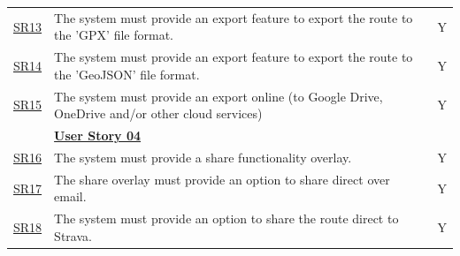 \begin{table}[!htb]
\begin{tabularx}{\textwidth}{ p{1cm} p{11cm} p{1cm} }
        \hyperref[SR:13]{SR13} & The system must provide an export feature to export the route to the 'GPX' file format. & Y\\
        \hyperref[SR:14]{SR14} & The system must provide an export feature to export the route to the 'GeoJSON' file format. & Y\\ 
        \hyperref[SR:15]{SR15} & The system must provide an export online (to Google Drive, OneDrive and/or other cloud services) & Y\\
        \hline
        & \textbf{\hyperref[tab:user-story-04]{User Story 04}}  \\
        \hyperref[SR:16]{SR16} & The system must provide a share functionality overlay. & Y \\
        \hyperref[SR:17]{SR17} & The share overlay must provide an option to share direct over email. & Y\\
        \hyperref[SR:18]{SR18} & The system must provide an option to share the route direct to Strava. & Y\\ 
        \hline
    \end{tabularx}
\end{table}
\clearpage

